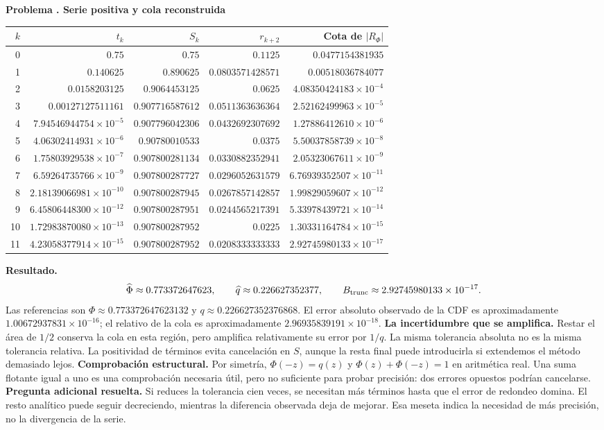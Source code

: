 \documentclass[11pt,a4paper]{article}
\theoremstyle{definition}
\newcounter{problema}
\newenvironment{resuelto}[1]{\refstepcounter{problema}\par\medskip\Needspace{6\baselineskip}\textbf{Problema \theproblema. #1}\par}{\par\medskip}
\begin{document}
\begin{resuelto}{Serie positiva y cola reconstruida}
\begin{center}\small\begin{tabular}{rrrrr}
\toprule
$k$&$t_k$&$S_k$&$r_{k+2}$&Cota de $|R_\Phi|$\\
\midrule
0&$0.75$&$0.75$&$0.1125$&$0.0477154381935$\\
1&$0.140625$&$0.890625$&$0.0803571428571$&$0.00518036784077$\\
2&$0.0158203125$&$0.9064453125$&$0.0625$&$4.08350424183\times10^{-4}$\\
3&$0.00127127511161$&$0.907716587612$&$0.0511363636364$&$2.52162499963\times10^{-5}$\\
4&$7.94546944754\times10^{-5}$&$0.907796042306$&$0.0432692307692$&$1.27886412610\times10^{-6}$\\
5&$4.06302414931\times10^{-6}$&$0.90780010533$&$0.0375$&$5.50037858739\times10^{-8}$\\
6&$1.75803929538\times10^{-7}$&$0.907800281134$&$0.0330882352941$&$2.05323067611\times10^{-9}$\\
7&$6.59264735766\times10^{-9}$&$0.907800287727$&$0.0296052631579$&$6.76939352507\times10^{-11}$\\
8&$2.18139066981\times10^{-10}$&$0.907800287945$&$0.0267857142857$&$1.99829059607\times10^{-12}$\\
9&$6.45806448300\times10^{-12}$&$0.907800287951$&$0.0244565217391$&$5.33978439721\times10^{-14}$\\
10&$1.72983870080\times10^{-13}$&$0.907800287952$&$0.0225$&$1.30331164784\times10^{-15}$\\
11&$4.23058377914\times10^{-15}$&$0.907800287952$&$0.0208333333333$&$2.92745980133\times10^{-17}$\\
\bottomrule\end{tabular}\end{center}
\textbf{Resultado.}
\[
\widehat\Phi\approx0.773372647623,\qquad \widehat q\approx0.226627352377,\qquad B_{\rm trunc}\approx2.92745980133\times10^{-17}.
\]
Las referencias son $\Phi\approx0.773372647623132$ y $q\approx0.226627352376868$. El error absoluto observado de la CDF es aproximadamente $1.00672937831\times10^{-16}$; el relativo de la cola es aproximadamente $2.96935839191\times10^{-18}$.
\textbf{La incertidumbre que se amplifica.} Restar el área de $1/2$ conserva la cola en esta región, pero amplifica relativamente su error por $1/q$. La misma tolerancia absoluta no es la misma tolerancia relativa. La positividad de términos evita cancelación en $S$, aunque la resta final puede introducirla si extendemos el método demasiado lejos.
\textbf{Comprobación estructural.} Por simetría, $\Phi(-z)=q(z)$ y $\Phi(z)+\Phi(-z)=1$ en aritmética real. Una suma flotante igual a uno es una comprobación necesaria útil, pero no suficiente para probar precisión: dos errores opuestos podrían cancelarse.
\textbf{Pregunta adicional resuelta.} Si reduces la tolerancia cien veces, se necesitan más términos hasta que el error de redondeo domina. El resto analítico puede seguir decreciendo, mientras la diferencia observada deja de mejorar. Esa meseta indica la necesidad de más precisión, no la divergencia de la serie.
\end{resuelto}
\end{document}

